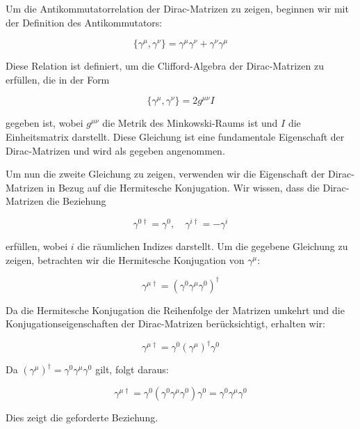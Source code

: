 Um die Antikommutatorrelation der Dirac-Matrizen zu zeigen, beginnen wir mit der Definition des Antikommutators:

\[
\{\gamma^\mu, \gamma^\nu\} = \gamma^\mu \gamma^\nu + \gamma^\nu \gamma^\mu
\]

Diese Relation ist definiert, um die Clifford-Algebra der Dirac-Matrizen zu erfüllen, die in der Form

\[
\{\gamma^\mu, \gamma^\nu\} = 2 g^{\mu \nu} I
\]

gegeben ist, wobei \( g^{\mu \nu} \) die Metrik des Minkowski-Raums ist und \( I \) die Einheitsmatrix darstellt. Diese Gleichung ist eine fundamentale Eigenschaft der Dirac-Matrizen und wird als gegeben angenommen.

Um nun die zweite Gleichung zu zeigen, verwenden wir die Eigenschaft der Dirac-Matrizen in Bezug auf die Hermitesche Konjugation. Wir wissen, dass die Dirac-Matrizen die Beziehung

\[
\gamma^{0 \dagger} = \gamma^0, \quad \gamma^{i \dagger} = -\gamma^i
\]

erfüllen, wobei \( i \) die räumlichen Indizes darstellt. Um die gegebene Gleichung zu zeigen, betrachten wir die Hermitesche Konjugation von \(\gamma^\mu\):

\[
\gamma^{\mu \dagger} = (\gamma^0 \gamma^\mu \gamma^0)^\dagger
\]

Da die Hermitesche Konjugation die Reihenfolge der Matrizen umkehrt und die Konjugationseigenschaften der Dirac-Matrizen berücksichtigt, erhalten wir:

\[
\gamma^{\mu \dagger} = \gamma^0 (\gamma^\mu)^\dagger \gamma^0
\]

Da \((\gamma^\mu)^\dagger = \gamma^0 \gamma^\mu \gamma^0\) gilt, folgt daraus:

\[
\gamma^{\mu \dagger} = \gamma^0 (\gamma^0 \gamma^\mu \gamma^0) \gamma^0 = \gamma^0 \gamma^\mu \gamma^0
\]

Dies zeigt die geforderte Beziehung.